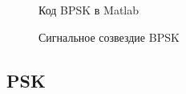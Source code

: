 \documentclass[a4paper,14pt]{extarticle}
\begin{document}
\begin{figure}[H]
\caption{Код BPSK в Matlab}
\label{1}
\end{figure}

\begin{figure}[H]
\caption{Сигнальное созвездие BPSK}
\label{2}
\end{figure}


\subsection{PSK}
\end{document}
